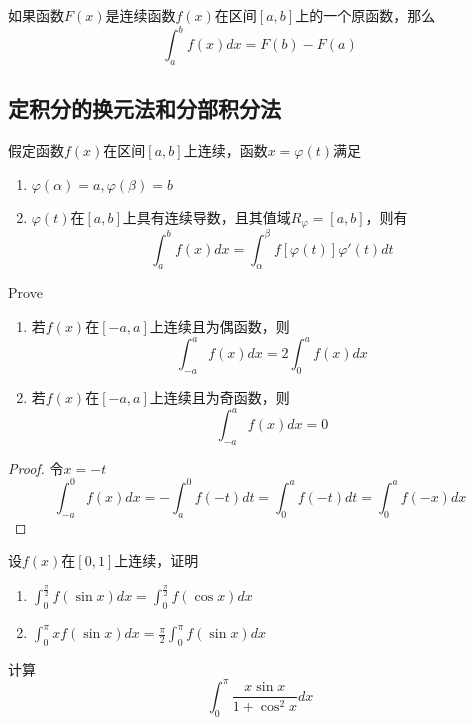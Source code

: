 \documentclass[11pt]{article}
\begin{document}
\begin{theorem}[微积分基本定理]
如果函数\(F(x)\)是连续函数\(f(x)\)在区间\([a,b]\)上的一个原函数，那么
\begin{equation*}
\int_a^bf(x)dx=F(b)-F(a)
\end{equation*}
\end{theorem}
\subsection{定积分的换元法和分部积分法}
\label{sec:org52eacec}
\begin{theorem}[]
假定函数\(f(x)\)在区间\([a,b]\)上连续，函数\(x=\varphi(t)\)满足
\begin{enumerate}
\item \(\varphi(\alpha)=a,\varphi(\beta)=b\)
\item \(\varphi(t)\)在\([a,b]\)上具有连续导数，且其值域\(R_\varphi=[a,b]\)，则有
\begin{equation*}
\int_a^bf(x)dx=\int_\alpha^\beta f[\varphi(t)]\varphi'(t)dt
\end{equation*}
\end{enumerate}
\end{theorem}

\begin{proposition}[]
Prove
\begin{enumerate}
\item 若\(f(x)\)在\([-a,a]\)上连续且为偶函数，则
\begin{equation*}
\int_{-a}^af(x)dx=2\int_0^af(x)dx
\end{equation*}
\item 若\(f(x)\)在\([-a,a]\)上连续且为奇函数，则
\begin{equation*}
\int_{-a}^af(x)dx=0
\end{equation*}
\end{enumerate}
\end{proposition}

\begin{proof}
令\(x=-t\)
\begin{equation*}
\int_{-a}^0f(x)dx=-\int_{a}^0f(-t)dt=\int_0^af(-t)dt=\int_0^af(-x)dx
\end{equation*}
\end{proof}

\begin{proposition}[]
设\(f(x)\)在\([0,1]\)上连续，证明
\begin{enumerate}
\item \(\int_0^{\frac{\pi}{2}}f(\sin x)dx=\int_0^{\frac{\pi}{2}}f(\cos x)dx\)
\item \(\int_0^\pi xf(\sin x)dx=\frac{\pi}{2}\int_0^\pi f(\sin x)dx\)
\end{enumerate}


计算
\begin{equation*}
\int_0^\pi\frac{x\sin x}{1+\cos^2x}dx
\end{equation*}
\end{proposition}
\end{document}
